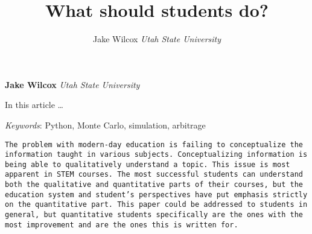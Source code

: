 \documentclass[11pt,]{article}
\title{What should students do?  }
\author{\Large Jake Wilcox\vspace{0.05in} \newline\normalsize\emph{Utah State University}  }
\date{}
\newcommand*{\authorfont}{\fontfamily{phv}\selectfont}
\renewenvironment{abstract}
 {{%
    \setlength{\leftmargin}{0mm}
    \setlength{\rightmargin}{\leftmargin}%
  }%
  \relax}
 {\endlist}
\begin{document}
	
%

{%
\setlength{\parindent}{0pt}
\thispagestyle{plain}
{\fontsize{18}{20}\selectfont\raggedright 
\maketitle  %

}

{
   \vskip 13.5pt\relax \normalsize\fontsize{11}{12} 
\textbf{\authorfont Jake Wilcox} \hskip 15pt \emph{\small Utah State University}   

}

}







\begin{abstract}

    \hbox{\vrule height .2pt width 39.14pc}

    \vskip 8.5pt %

\noindent In this article \ldots{}


\vskip 8.5pt \noindent \emph{Keywords}: Python, Monte Carlo, simulation, arbitrage \par

    \hbox{\vrule height .2pt width 39.14pc}



\end{abstract}


\vskip 6.5pt

\noindent \doublespacing \begin{quote}
\end{quote}

\begin{verbatim}
The problem with modern-day education is failing to conceptualize the information taught in various subjects. Conceptualizing information is being able to qualitatively understand a topic. This issue is most apparent in STEM courses. The most successful students can understand both the qualitative and quantitative parts of their courses, but the education system and student’s perspectives have put emphasis strictly on the quantitative part. This paper could be addressed to students in general, but quantitative students specifically are the ones with the most improvement and are the ones this is written for. 
\end{verbatim}
\end{document}
